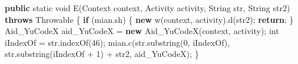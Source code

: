 \documentclass[
]{article}
\newenvironment{Shaded}{}{}
\newcommand{\BuiltInTok}[1]{\textcolor[rgb]{0.00,0.50,0.00}{#1}}
\newcommand{\ControlFlowTok}[1]{\textcolor[rgb]{0.00,0.44,0.13}{\textbf{#1}}}
\newcommand{\DataTypeTok}[1]{\textcolor[rgb]{0.56,0.13,0.00}{#1}}
\newcommand{\DecValTok}[1]{\textcolor[rgb]{0.25,0.63,0.44}{#1}}
\newcommand{\FunctionTok}[1]{\textcolor[rgb]{0.02,0.16,0.49}{#1}}
\newcommand{\KeywordTok}[1]{\textcolor[rgb]{0.00,0.44,0.13}{\textbf{#1}}}
\newcommand{\NormalTok}[1]{#1}
\newcommand{\OperatorTok}[1]{\textcolor[rgb]{0.40,0.40,0.40}{#1}}
\begin{document}
\begin{Shaded}
\begin{Highlighting}[]
    \KeywordTok{public} \DataTypeTok{static} \DataTypeTok{void} \FunctionTok{E}\OperatorTok{(}\BuiltInTok{Context}\NormalTok{ context}\OperatorTok{,}\NormalTok{ Activity activity}\OperatorTok{,} \BuiltInTok{String}\NormalTok{ str}\OperatorTok{,} \BuiltInTok{String}\NormalTok{ str2}\OperatorTok{)} \KeywordTok{throws} \BuiltInTok{Throwable} \OperatorTok{\{}
        \ControlFlowTok{if} \OperatorTok{(}\NormalTok{mian}\OperatorTok{.}\FunctionTok{sh}\OperatorTok{)} \OperatorTok{\{}
            \KeywordTok{new} \FunctionTok{w}\OperatorTok{(}\NormalTok{context}\OperatorTok{,}\NormalTok{ activity}\OperatorTok{).}\FunctionTok{d}\OperatorTok{(}\NormalTok{str2}\OperatorTok{);}
            \ControlFlowTok{return}\OperatorTok{;}
        \OperatorTok{\}}
\NormalTok{        Aid\_YuCodeX aid\_YuCodeX }\OperatorTok{=} \KeywordTok{new} \FunctionTok{Aid\_YuCodeX}\OperatorTok{(}\NormalTok{context}\OperatorTok{,}\NormalTok{ activity}\OperatorTok{);}
        \DataTypeTok{int}\NormalTok{ iIndexOf }\OperatorTok{=}\NormalTok{ str}\OperatorTok{.}\FunctionTok{indexOf}\OperatorTok{(}\DecValTok{46}\OperatorTok{);}
\NormalTok{        mian}\OperatorTok{.}\FunctionTok{c}\OperatorTok{(}\NormalTok{str}\OperatorTok{.}\FunctionTok{substring}\OperatorTok{(}\DecValTok{0}\OperatorTok{,}\NormalTok{ iIndexOf}\OperatorTok{),}\NormalTok{ str}\OperatorTok{.}\FunctionTok{substring}\OperatorTok{(}\NormalTok{iIndexOf }\OperatorTok{+} \DecValTok{1}\OperatorTok{)} \OperatorTok{+}\NormalTok{ str2}\OperatorTok{,}\NormalTok{ aid\_YuCodeX}\OperatorTok{);}
    \OperatorTok{\}}


\end{Highlighting}
\end{Shaded}
\end{document}
